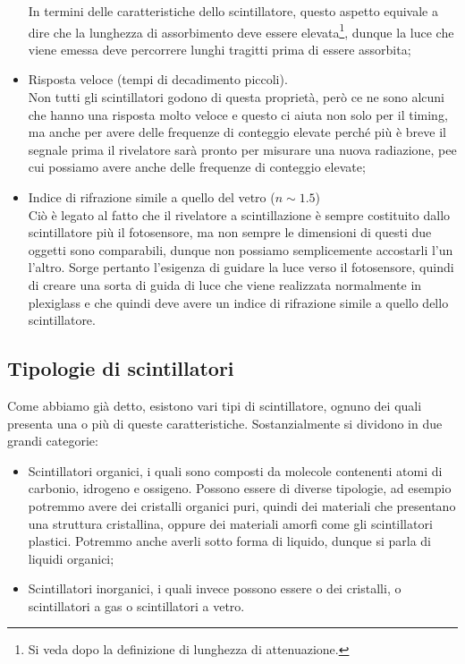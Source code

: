 \begin{itemize}[leftmargin=0.5cm]
   In termini delle caratteristiche dello scintillatore, questo aspetto equivale a dire che la lunghezza di assorbimento deve essere elevata\footnote{Si veda dopo la definizione di lunghezza di attenuazione.}, dunque la luce che viene emessa deve percorrere lunghi tragitti prima di essere assorbita;
   \item Risposta veloce (tempi di decadimento piccoli).\\
   Non tutti gli scintillatori godono di questa proprietà, però ce ne sono alcuni che hanno una risposta molto veloce e questo ci aiuta non solo per il timing, ma anche per avere delle frequenze di conteggio elevate perché più è breve il segnale prima il rivelatore sarà pronto per misurare una nuova radiazione, pee cui possiamo avere anche delle frequenze di conteggio elevate;
   \item Indice di rifrazione simile a quello del vetro ($n \sim 1.5$)\\
   Ciò è legato al fatto che il rivelatore a scintillazione è sempre costituito dallo scintillatore più il fotosensore, ma non sempre le dimensioni di questi due oggetti sono comparabili, dunque non possiamo semplicemente accostarli l'un l'altro. Sorge pertanto l'esigenza di guidare la luce verso il fotosensore, quindi di creare una sorta di guida di luce che viene realizzata normalmente in plexiglass e che quindi deve avere un indice di rifrazione simile a quello dello scintillatore.
\end{itemize}

\subsection{Tipologie di scintillatori}

Come abbiamo già detto, esistono vari tipi di scintillatore, ognuno dei quali presenta una o più di queste caratteristiche. Sostanzialmente si dividono in due grandi categorie:
\begin{itemize}[leftmargin=0.5cm]
   \item Scintillatori organici, i quali sono composti da molecole contenenti atomi di carbonio, idrogeno e ossigeno. Possono essere di diverse tipologie, ad esempio potremmo avere dei cristalli organici puri, quindi dei materiali che presentano una struttura cristallina, oppure dei materiali amorfi come gli scintillatori plastici. Potremmo anche averli sotto forma di liquido, dunque si parla di liquidi organici;
   \item Scintillatori inorganici, i quali invece possono essere o dei cristalli, o scintillatori a gas o scintillatori a vetro.
\end{itemize}

